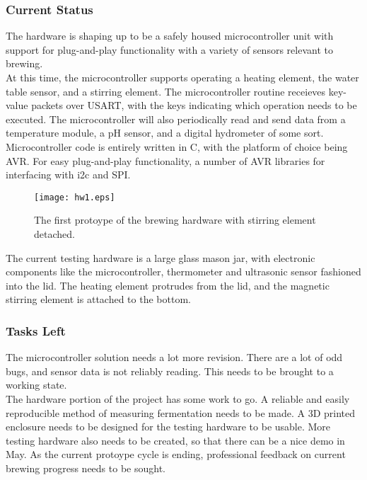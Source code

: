 \documentclass[draftclsnofoot,onecolumn,letterpaper,10pt]{IEEEtran}
\begin{document}
\subsubsection{Current Status}
The hardware is shaping up to be a safely housed microcontroller unit with support
for plug-and-play functionality with a variety of sensors relevant to brewing. \\
At this time, the microcontroller supports operating a heating element, the water
table sensor, and a stirring element.
The microcontroller routine receieves key-value packets over USART, with the keys
indicating which operation needs to be executed.
The microcontroller will also periodically read and send data from a temperature
module, a pH sensor, and a digital hydrometer of some sort.
Microcontroller code is entirely written in C, with the platform of choice being
AVR.
For easy plug-and-play functionality, a number of AVR libraries for interfacing
with i2c and SPI. \\
\begin{figure}
\label{fig:hw1}
\caption{The first protoype of the brewing hardware with stirring element detached.}
\texttt{[image: hw1.eps]}
\end{figure}
The current testing hardware is a large glass mason jar, with electronic components
like the microcontroller, thermometer and ultrasonic sensor fashioned into the lid.
The heating element protrudes from the lid, and the magnetic stirring element
is attached to the bottom.

\subsubsection{Tasks Left}
The microcontroller solution needs a lot more revision.
There are a lot of odd bugs, and sensor data is not reliably reading.
This needs to be brought to a working state. \\
The hardware portion of the project has some work to go.
A reliable and easily reproducible method of measuring fermentation needs to be made.
A 3D printed enclosure needs to be designed for the testing hardware to be usable.
More testing hardware also needs to be created, so that there can be a nice demo in May.
As the current protoype cycle is ending, professional feedback on current brewing progress
needs to be sought.
\end{document}
